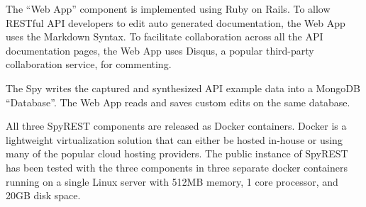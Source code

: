 \documentclass[conference]{IEEEtran}
\begin{document}
The ``Web App'' component is implemented using Ruby on Rails. To allow RESTful API developers to edit auto generated documentation, the Web App uses the Markdown Syntax. To facilitate collaboration across all the API documentation pages, the Web App uses Disqus, a popular third-party collaboration service, for commenting.

The Spy writes the captured and synthesized API example data into a MongoDB ``Database''. The Web App reads and saves custom edits on the same database.

All three SpyREST components are released as Docker containers. Docker is a lightweight virtualization solution that can either be hosted in-house or using many of the popular cloud hosting providers. The public instance of SpyREST has been tested with the three components in three separate docker containers running on a single Linux server with 512MB memory, 1 core processor, and 20GB disk space.
\end{document}
